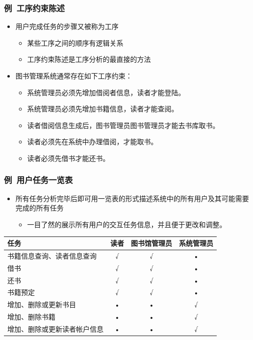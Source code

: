 \documentclass{beamer}
\begin{document}
\begin{frame}
	\frametitle{例~{\small 工序约束陈述}}
	\beamertemplatetransparentcovereddynamicmedium
	\begin{itemize}[<+->]
		\item 用户完成任务的步骤又被称为工序
		\begin{itemize}
			\item 某些工序之间的顺序有逻辑关系
			\item 工序约束陈述是工序分析的最直接的方法
		\end{itemize}
		\item 图书管理系统通常存在如下工序约束：
		\begin{itemize}
			\item 系统管理员必须先增加借阅者信息，读者才能登陆。
			\item 系统管理员必须先增加书籍信息，读者才能查阅。
			\item 读者借阅信息生成后，图书管理员图书管理员才能去书库取书。
			\item 读者必须先在系统中办理借阅，才能取书。
			\item 读者必须先借书才能还书。
		\end{itemize}
	\end{itemize}
\end{frame}

\begin{frame}
	\frametitle{例~{\small 用户任务一览表}}
	\begin{itemize}
		\item 所有任务分析完毕后即可用一览表的形式描述系统中的所有用户及其可能需要完成的所有任务
		\begin{itemize}
			\item 一目了然的展示所有用户的交互任务信息，并且便于更改和调整。
		\end{itemize}
	\end{itemize}
	\begin{center}
	\begin{tiny}
	\begin{tabular}{|l|c|c|c|}
	\hline 
	任务 & 读者 & 图书馆管理员 & 系统管理员 \\ 
	\hline 
	书籍信息查询、读者信息查询 & √ & √ & • \\ 
	\hline 
	借书 & √ & √ & • \\ 
	\hline 
	还书 & √ & √ & • \\ 
	\hline 
	书籍预定 & √ & √ & • \\ 
	\hline 
	增加、删除或更新书目 & • & • & √ \\ 
	\hline 
	增加、删除书籍 & • & • & √ \\ 
	\hline 
	增加、删除或更新读者帐户信息 & • & • & √ \\ 
	\hline 
	\end{tabular} 
	\end{tiny}
	\end{center}
\end{frame}
 
\end{document}
